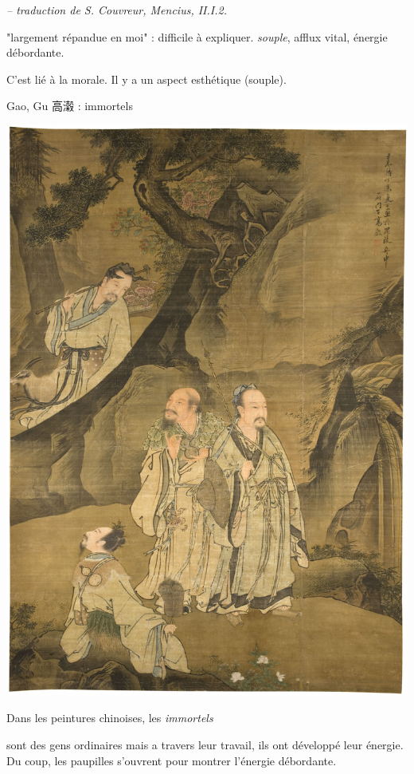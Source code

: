 \begin{singlequote}
\textit{\small -- traduction de S. Couvreur, Mencius, II.I.2. }
\end{singlequote}

\begin{Def}[sensibilité]
    "largement répandue en moi" : difficile à expliquer. \textit{souple}, afflux vital, énergie débordante. 
\end{Def}
C'est lié à la morale. Il y a un aspect esthétique (souple). 
\begin{marginfigure}
\caption{Gao, Gu 高濲 : immortels}
    \includegraphics[width=\textwidth]{ConfucianismeTaoismeBouddhismeChinois/Images/Immortels.jpg}
\end{marginfigure}
\begin{Ex}
    Dans les peintures chinoises, les \textit{immortels}  

 sont des gens ordinaires mais a travers leur travail, ils ont développé leur énergie. Du coup, les paupilles s'ouvrent pour montrer l'énergie débordante.
\end{Ex}

